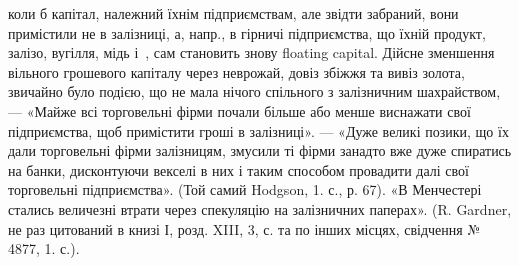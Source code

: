 \parcont{}  %
коли б капітал, належний їхнім підприємствам, але звідти забраний, вони примістили
не в залізниці, а, напр., в гірничі підприємства, що їхній продукт,
залізо, вугілля, мідь і~, сам становить знову floating capital. Дійсне зменшення
вільного грошевого капіталу через неврожай, довіз збіжжя та вивіз
золота, звичайно було подією, що не мала нічого спільного з залізничним
шахрайством, — «Майже всі торговельні фірми почали більше або менше виснажати
свої підприємства, щоб примістити гроші в залізниці». — «Дуже великі позики,
що їх дали торговельні фірми залізницям, змусили ті фірми занадто вже дуже
спиратись на банки, дисконтуючи векселі в них і таким способом провадити
далі свої торговельні підприємства». (Той самий Hodgson, 1. с., р. 67). «В Менчестері
стались величезні втрати через спекуляцію на залізничних паперах».
(R. Gardner, не раз цитований в книзі І, розд. XIII, 3, с. та по інших місцях,
свідчення № 4877, 1. с.).

